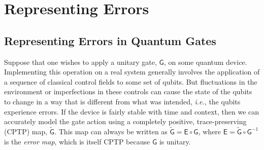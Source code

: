 \documentclass[aps,nofootinbib,pra,notitlepage,twocolumn]{revtex4-1}
\newcommand{\note}[1]{}
\begin{document}






\section{Representing Errors }
\label{sec:representing_quantum_gates}

\subsection{Representing Errors in Quantum Gates}
\noindent Suppose that one wishes to apply a unitary gate, $\mathsf{G}$, on some quantum device. Implementing this operation on a real system generally involves the application of a sequence of classical control fields to some set of qubits.  But fluctuations in the environment or imperfections in these controls can cause the state of the qubits to change in a way that is different from what was intended, \emph{i.e.}, the qubits experience errors. If the device is fairly stable with time and context\cite{Rudinger2019}, then we can accurately model the gate action using a completely positive, trace-preserving (CPTP) map, $\mathsf{\tilde G}$. This map can always be written as $\mathsf{\tilde G} = \mathsf{E}\circ\mathsf{G}$, where $\mathsf{E} = \mathsf{\tilde G}\circ\mathsf{G}^{-1}$ is the \emph{error map}, which is itself CPTP because $\mathsf{G}$ is unitary.
\end{document}
